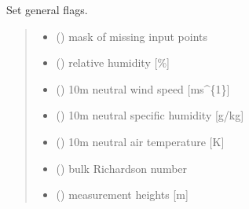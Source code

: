 \documentclass[letterpaper,10pt,english]{sphinxmanual}
\begin{document}
\begin{fulllineitems}
\label{\detokenize{users_guide:util_subs.set_flag}}
\pysigstartsignatures
{}
\pysigstopsignatures
\sphinxAtStartPar
Set general flags.
\begin{quote}\begin{description}
\begin{itemize}
\item {} 
\sphinxAtStartPar
{} () \textendash{} mask of missing input points

\item {} 
\sphinxAtStartPar
{} () \textendash{} relative humidity             {[}\%{]}

\item {} 
\sphinxAtStartPar
{} () \textendash{} 10m neutral wind speed        {[}ms\textasciicircum{}\{\sphinxhyphen{}1\}{]}

\item {} 
\sphinxAtStartPar
{} () \textendash{} 10m neutral specific humidity {[}g/kg{]}

\item {} 
\sphinxAtStartPar
{} () \textendash{} 10m neutral air temperature   {[}K{]}

\item {} 
\sphinxAtStartPar
{} () \textendash{} bulk Richardson number

\item {} 
\sphinxAtStartPar
{} () \textendash{} measurement heights           {[}m{]}


\end{itemize}
\end{description}
\end{quote}
\end{fulllineitems}
\end{document}
